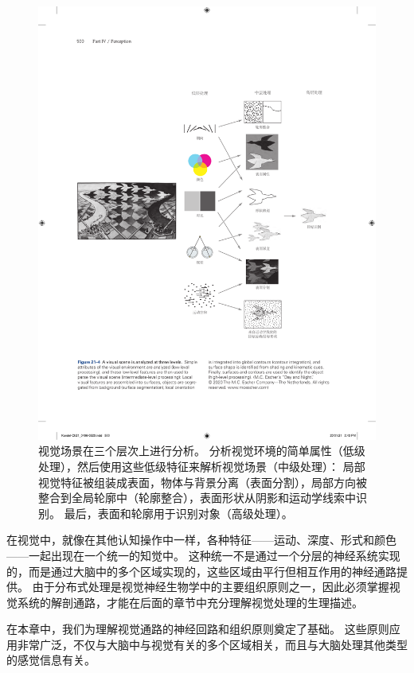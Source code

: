 \begin{figure}[htbp]
	\centering
	\includegraphics[width=1.0\linewidth]{chap21/fig_21_4}
	\caption{视觉场景在三个层次上进行分析。
		分析视觉环境的简单属性（低级处理），然后使用这些低级特征来解析视觉场景（中级处理）：
		局部视觉特征被组装成表面，物体与背景分离（表面分割），局部方向被整合到全局轮廓中（轮廓整合），表面形状从阴影和运动学线索中识别。
		最后，表面和轮廓用于识别对象（高级处理）。}
	\label{fig:21_4}
\end{figure}


在视觉中，就像在其他认知操作中一样，各种特征——运动、深度、形式和颜色——一起出现在一个统一的知觉中。
这种统一不是通过一个分层的神经系统实现的，而是通过大脑中的多个区域实现的，这些区域由平行但相互作用的神经通路提供。
由于分布式处理是视觉神经生物学中的主要组织原则之一，因此必须掌握视觉系统的解剖通路，才能在后面的章节中充分理解视觉处理的生理描述。


在本章中，我们为理解视觉通路的神经回路和组织原则奠定了基础。
这些原则应用非常广泛，不仅与大脑中与视觉有关的多个区域相关，而且与大脑处理其他类型的感觉信息有关。



